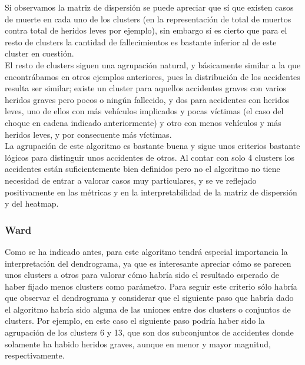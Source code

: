 	Si observamos la matriz de dispersión se puede apreciar que sí que existen casos de muerte en cada uno de los clusters (en la representación de total de muertos contra total de heridos leves por ejemplo), sin embargo sí es cierto que para el resto de clusters la cantidad de fallecimientos es bastante inferior al de este cluster en cuestión.\\

	El resto de clusters siguen una agrupación natural, y básicamente similar a la que encontrábamos en otros ejemplos anteriores, pues la distribución de los accidentes resulta ser similar; existe un cluster para aquellos accidentes graves con varios heridos graves pero pocos o ningún fallecido, y dos para accidentes con heridos leves, uno de ellos con más vehículos implicados y pocas víctimas (el caso del choque en cadena indicado anteriormente) y otro con menos vehículos y más heridos leves, y por consecuente más víctimas.\\
	
	La agrupación de este algoritmo es bastante buena y sigue unos criterios bastante lógicos para distinguir unos accidentes de otros. Al contar con solo 4 clusters los accidentes están suficientemente bien definidos pero no el algoritmo no tiene necesidad de entrar a valorar casos muy particulares, y se ve reflejado positivamente en las métricas y en la interpretabilidad de la matriz de dispersión y del heatmap.
	
	\subsubsection{Ward}
	Como se ha indicado antes, para este algoritmo tendrá especial importancia la interpretación del dendrograma, ya que es interesante apreciar cómo se parecen unos clusters a otros para valorar cómo habría sido el resultado esperado de haber fijado menos clusters como parámetro. Para seguir este criterio sólo habría que observar el dendrograma y considerar que el siguiente paso que habría dado el algoritmo habría sido alguna de las uniones entre dos clusters o conjuntos de clusters. Por ejemplo, en este caso el siguiente paso podría haber sido la agrupación de los clusters 6 y 13, que son dos subconjuntos de accidentes donde solamente ha habido heridos graves, aunque en menor y mayor magnitud, respectivamente.
	
